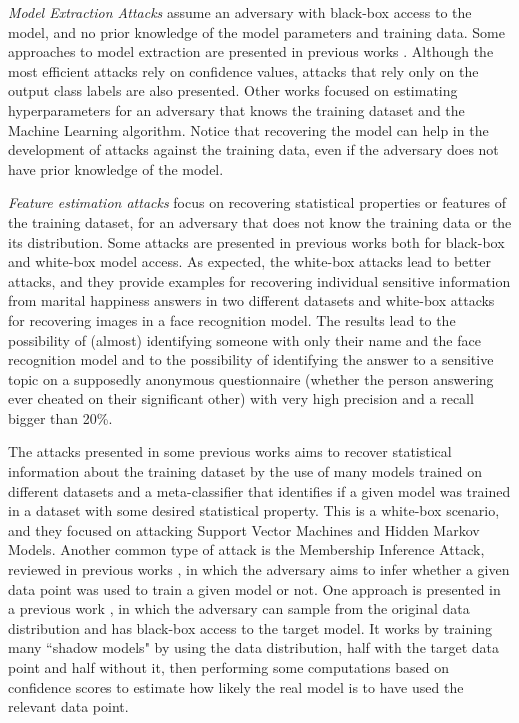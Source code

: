 \documentclass[conference]{IEEEtran}
\newcommand{\qm}[1]{``#1"}
\begin{document}
\emph{Model Extraction Attacks} assume an adversary with black-box access to the model, and no prior knowledge of the model parameters and training data. Some approaches to model extraction are presented in previous works \cite{tramer2016stealing}. Although the most efficient attacks rely on confidence values, attacks that rely only on the output class labels are also presented. Other works focused on estimating hyperparameters \cite{wang2018stealing} for an adversary that knows the training dataset and the Machine Learning algorithm. Notice that recovering the model can help in the development of attacks against the training data, even if the adversary does not have prior knowledge of the model.

\emph{Feature estimation attacks} focus on recovering statistical properties or features of the training dataset, for an adversary that does not know the training data or the its distribution. Some attacks are presented in previous works \cite{fredrikson2015model} both for black-box and white-box model access. As expected, the white-box attacks lead to better attacks, and they provide examples for recovering individual sensitive information from marital happiness answers in two different datasets and white-box attacks for recovering images in a face recognition model. The results lead to the possibility of (almost) identifying someone with only their name and the face recognition model and to the possibility of identifying the answer to a sensitive topic on a supposedly anonymous questionnaire (whether the person answering ever cheated on their significant other) with very high precision and a recall bigger than 20\%. 

The attacks presented in some previous works \cite{ateniese2015hacking} aims to recover statistical information about the training dataset by the use of many models trained on different datasets and a meta-classifier that identifies if a given model was trained in a dataset with some desired statistical property. This is a white-box scenario, and they focused on attacking Support Vector Machines and Hidden Markov Models. Another common type of attack is the Membership Inference Attack, reviewed in previous works \cite{hu2022membership}, in which the adversary aims to infer whether a given data point was used to train a given model or not. One approach is presented in a previous work \cite{carlini2022membership}, in which the adversary can sample from the original data distribution and has black-box access to the target model. It works by training many \qm{shadow models} by using the data distribution, half with the target data point and half without it, then performing some computations based on confidence scores to estimate how likely the real model is to have used the relevant data point.
\end{document}
